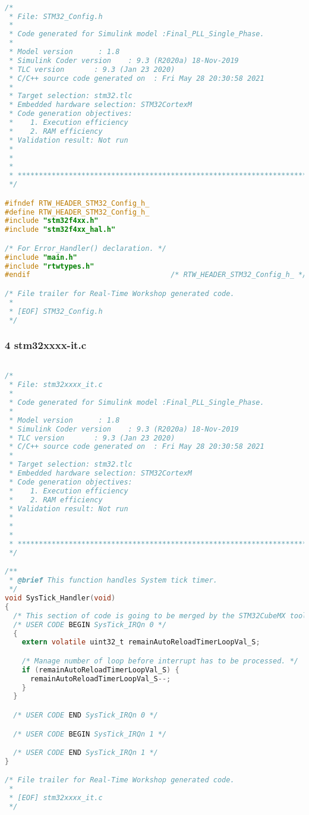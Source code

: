 \begin{lstlisting}[language=C,caption=Model.c]

/*
 * File: STM32_Config.h
 *
 * Code generated for Simulink model :Final_PLL_Single_Phase.
 *
 * Model version      : 1.8
 * Simulink Coder version    : 9.3 (R2020a) 18-Nov-2019
 * TLC version       : 9.3 (Jan 23 2020)
 * C/C++ source code generated on  : Fri May 28 20:30:58 2021
 *
 * Target selection: stm32.tlc
 * Embedded hardware selection: STM32CortexM
 * Code generation objectives:
 *    1. Execution efficiency
 *    2. RAM efficiency
 * Validation result: Not run
 *
 *
 *
 * ******************************************************************************
 */

#ifndef RTW_HEADER_STM32_Config_h_
#define RTW_HEADER_STM32_Config_h_
#include "stm32f4xx.h"
#include "stm32f4xx_hal.h"

/* For Error_Handler() declaration. */
#include "main.h"
#include "rtwtypes.h"
#endif                                 /* RTW_HEADER_STM32_Config_h_ */

/* File trailer for Real-Time Workshop generated code.
 *
 * [EOF] STM32_Config.h
 */


\end{lstlisting}

\subsubsection{4 stm32xxxx-it.c}
\begin{lstlisting}[language=C,caption=Model.c]

/*
 * File: stm32xxxx_it.c
 *
 * Code generated for Simulink model :Final_PLL_Single_Phase.
 *
 * Model version      : 1.8
 * Simulink Coder version    : 9.3 (R2020a) 18-Nov-2019
 * TLC version       : 9.3 (Jan 23 2020)
 * C/C++ source code generated on  : Fri May 28 20:30:58 2021
 *
 * Target selection: stm32.tlc
 * Embedded hardware selection: STM32CortexM
 * Code generation objectives:
 *    1. Execution efficiency
 *    2. RAM efficiency
 * Validation result: Not run
 *
 *
 *
 * ******************************************************************************
 */

/**
 * @brief This function handles System tick timer.
 */
void SysTick_Handler(void)
{
  /* This section of code is going to be merged by the STM32CubeMX tool. */
  /* USER CODE BEGIN SysTick_IRQn 0 */
  {
    extern volatile uint32_t remainAutoReloadTimerLoopVal_S;

    /* Manage number of loop before interrupt has to be processed. */
    if (remainAutoReloadTimerLoopVal_S) {
      remainAutoReloadTimerLoopVal_S--;
    }
  }

  /* USER CODE END SysTick_IRQn 0 */

  /* USER CODE BEGIN SysTick_IRQn 1 */

  /* USER CODE END SysTick_IRQn 1 */
}

/* File trailer for Real-Time Workshop generated code.
 *
 * [EOF] stm32xxxx_it.c
 */


\end{lstlisting}